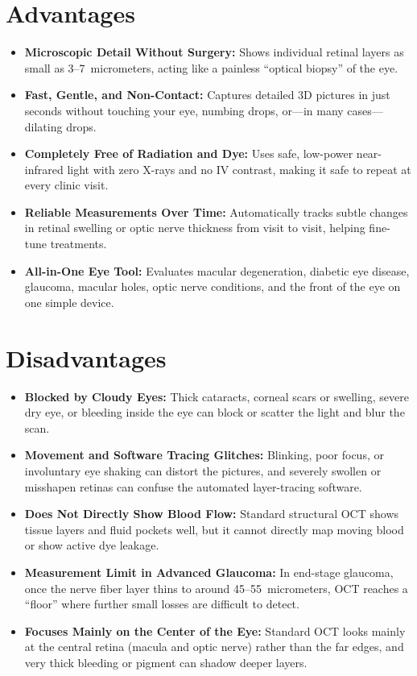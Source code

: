 \section{Advantages}
\begin{itemize}
\item \textbf{Microscopic Detail Without Surgery:} Shows individual retinal layers as small as 3--7~micrometers, acting like a painless ``optical biopsy'' of the eye.
\item \textbf{Fast, Gentle, and Non-Contact:} Captures detailed 3D pictures in just seconds without touching your eye, numbing drops, or---in many cases---dilating drops.
\item \textbf{Completely Free of Radiation and Dye:} Uses safe, low-power near-infrared light with zero X-rays and no IV contrast, making it safe to repeat at every clinic visit.
\item \textbf{Reliable Measurements Over Time:} Automatically tracks subtle changes in retinal swelling or optic nerve thickness from visit to visit, helping fine-tune treatments.
\item \textbf{All-in-One Eye Tool:} Evaluates macular degeneration, diabetic eye disease, glaucoma, macular holes, optic nerve conditions, and the front of the eye on one simple device.
\end{itemize}

\section{Disadvantages}
\begin{itemize}
\item \textbf{Blocked by Cloudy Eyes:} Thick cataracts, corneal scars or swelling, severe dry eye, or bleeding inside the eye can block or scatter the light and blur the scan.
\item \textbf{Movement and Software Tracing Glitches:} Blinking, poor focus, or involuntary eye shaking can distort the pictures, and severely swollen or misshapen retinas can confuse the automated layer-tracing software.
\item \textbf{Does Not Directly Show Blood Flow:} Standard structural OCT shows tissue layers and fluid pockets well, but it cannot directly map moving blood or show active dye leakage.
\item \textbf{Measurement Limit in Advanced Glaucoma:} In end-stage glaucoma, once the nerve fiber layer thins to around 45--55~micrometers, OCT reaches a ``floor'' where further small losses are difficult to detect.
\item \textbf{Focuses Mainly on the Center of the Eye:} Standard OCT looks mainly at the central retina (macula and optic nerve) rather than the far edges, and very thick bleeding or pigment can shadow deeper layers.
\end{itemize}

